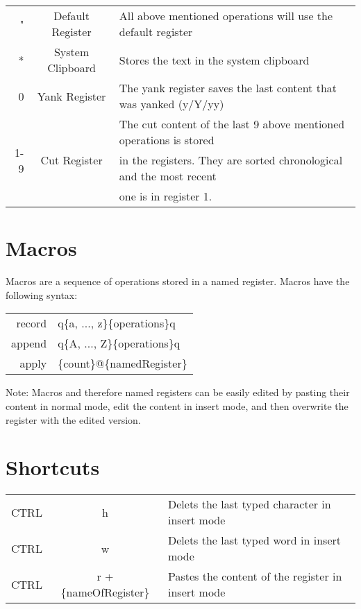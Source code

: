 \documentclass{article}
\begin{document}
\begin{tabular}{ r c l }
 " & Default Register & All above mentioned operations will use the default register \\[0.5ex]
 * & System Clipboard & Stores the text in the system clipboard\\[0.5ex]
 0 & Yank Register & The yank register saves the last content that was yanked (y/Y/yy)\\[0.5ex]
 \multirow{3}{1.6em}{1-9} & \multirow{3}{6em}{Cut Register} & The cut content of the last 9 above mentioned operations is stored \\[0.5ex]
 & &  in the registers. They are sorted chronological and the most recent \\[0.5ex]
 & & one is in register 1.\\[0.5ex]
 \end{tabular}


\section{Macros}
Macros are a sequence of operations stored in a named register. Macros have the following syntax:

\vspace{3mm}
\begin{tabular}{ r l }
 record & q\{a, ..., z\}\{operations\}q  \\[0.5ex]
 append & q\{A, ..., Z\}\{operations\}q  \\[0.5ex]
 apply & \{count\}@\{namedRegister\}  \\[0.5ex]
\end{tabular}


\vspace{3mm}
\noindent
Note: Macros and therefore named registers can be easily edited by pasting their content in normal mode, edit the content in insert mode, and then overwrite the register with the edited version. 

\section{Shortcuts}
\begin{tabular}{ r c l }
 CTRL & h & Delets the last typed character in insert mode\\[0.5ex]
 CTRL & w & Delets the last typed word in insert mode\\[0.5ex]
 CTRL & r + \{nameOfRegister\} & Pastes the content of the register in insert mode\\[0.5ex]
\end{tabular}
\end{document}
